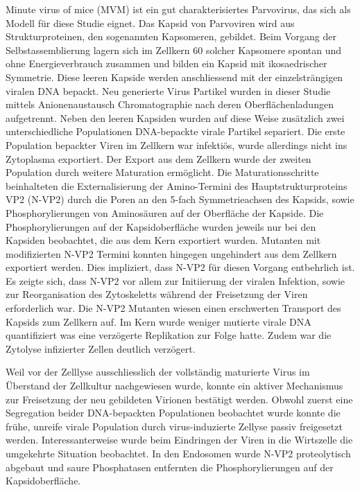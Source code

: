\par
\medskip
Minute virus of mice (MVM) ist ein gut charakterisiertes Parvovirus, das sich als Modell für diese Studie eignet. Das Kapsid von Parvoviren wird aus Strukturproteinen, den sogenannten Kapsomeren, gebildet. Beim Vorgang der Selbstassemblierung lagern sich im Zellkern 60 solcher Kapsomere spontan und ohne Energieverbrauch zusammen und bilden ein Kapsid mit ikosaedrischer Symmetrie. Diese leeren Kapside werden anschliessend mit der einzelsträngigen viralen DNA bepackt. Neu generierte Virus Partikel wurden in dieser Studie mittels A\-ni\-o\-nen\-aus\-tausch Chromatographie nach deren Oberflächenladungen aufgetrennt. Neben den leeren Kapsiden wurden auf diese Weise zusätzlich zwei unterschiedliche Populationen DNA-bepackte virale Partikel separiert. Die erste Population bepackter Viren im Zellkern war infektiös, wurde allerdings nicht ins Zytoplasma exportiert. Der Export aus dem Zellkern wurde der zweiten Population durch weitere Maturation ermöglicht. Die Maturationsschritte beinhalteten die Externalisierung der Amino-Termini des Hauptstrukturproteins VP2 (N-VP2) durch die Poren an den 5-fach Symmetrieachsen des Kapsids, sowie Phosphorylierungen von Aminosäuren auf der Oberfläche der Kapside. Die Phosphorylierungen auf der Kapsidoberfläche wurden jeweils nur bei den Kapsiden beobachtet, die aus dem Kern exportiert wurden. Mutanten mit modifizierten N-VP2 Termini konnten hingegen ungehindert aus dem Zellkern exportiert werden. Dies impliziert, dass N-VP2 für diesen Vorgang entbehrlich ist. Es zeigte sich, dass N-VP2 vor allem zur Initiierung der viralen Infektion, sowie zur Reorganisation des Zytoskeletts während der Freisetzung der Viren erforderlich war. Die N-VP2 Mutanten wiesen einen erschwerten Transport des Kapsids zum Zellkern auf. Im Kern wurde weniger mutierte virale DNA quantifiziert was eine verzögerte Replikation zur Folge hatte. Zudem war die Zytolyse infizierter Zellen deutlich verzögert.  

\par
\medskip
Weil vor der Zelllyse ausschliesslich der vollständig maturierte Virus im Überstand der Zellkultur nachgewiesen wurde, konnte ein aktiver Mechanismus zur Freisetzung der neu gebildeten Virionen bestätigt werden. Obwohl zuerst eine Segregation beider DNA-bepackten Populationen beobachtet wurde konnte die frühe, unreife virale Population durch virus-induzierte Zellyse passiv freigesetzt werden. Interessanterweise wurde beim Eindringen der Viren in die Wirtszelle die umgekehrte Situation beobachtet. In den Endosomen wurde N-VP2 proteolytisch abgebaut und saure Phosphatasen entfernten die Phosphorylierungen auf der Kapsidoberfläche. 

